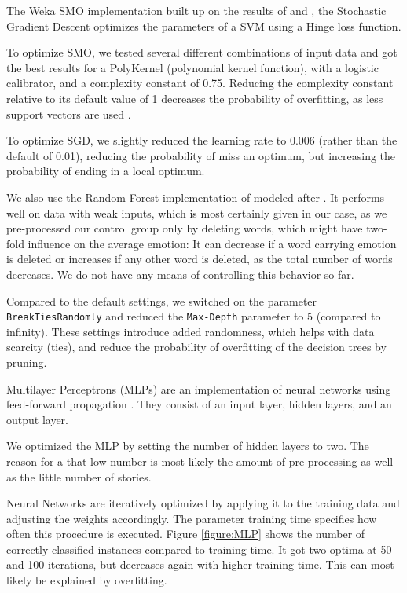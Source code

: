 \documentclass[letterpaper]{article}
\begin{document}
The Weka SMO implementation built up on the results of \cite{Platt1998} and \cite{Keerthi2001}, the Stochastic Gradient Descent \cite{SGD} optimizes the parameters of a SVM using a Hinge loss function. 

To optimize SMO, we tested several different combinations of input data and got the best results for a PolyKernel (polynomial kernel function), with a logistic calibrator, and a complexity constant of 0.75. Reducing the complexity constant relative to its default value of 1 decreases the probability of overfitting, as less support vectors are used \cite[p.~224]{alpaydin2004introduction}. 

To optimize SGD, we slightly reduced the learning rate to 0.006 (rather than the default of 0.01), reducing the probability of miss an optimum, but increasing the probability of ending in a local optimum. 

We also use the Random Forest implementation of \cite{livingston2005implementation} modeled after \cite{breiman2001random}. It performs well on data with weak inputs, which is most certainly given in our case, as we pre-processed our control group only by deleting words, which might have two-fold influence on the average emotion: It can decrease if a word carrying emotion is deleted or increases if any other word is deleted, as the total number of words decreases. We do not have any means of controlling this behavior so far. 

Compared to the default settings, we switched on the parameter \texttt{BreakTiesRandomly} and reduced the \texttt{Max-Depth} parameter to 5 (compared to infinity). These settings introduce added randomness, which helps with data scarcity (ties), and reduce the probability of overfitting of the decision trees by pruning. 

Multilayer Perceptrons (MLPs) are an implementation of neural networks using feed-forward propagation \cite{rosenblatt1961principles,haykin2004comprehensive}. They consist of an input layer, hidden layers, and an output layer. 

We optimized the MLP by setting the number of hidden layers to two. The reason for a that low number is most likely the amount of pre-processing as well as the little number of stories. 

Neural Networks are iteratively optimized by applying it to the training data and adjusting the weights accordingly. The parameter training time specifies how often this procedure is executed. Figure \ref{figure:MLP} shows the number of correctly classified instances compared to training time. It got two optima at 50 and 100 iterations, but decreases again with higher training time. This can most likely be explained by overfitting. 
\end{document}
